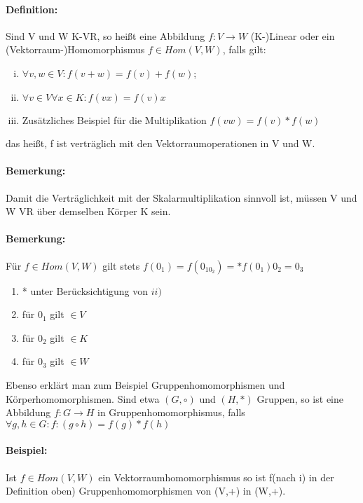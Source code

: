 \paragraph{Definition:} Sind V und W K-VR, so heißt eine Abbildung $f: V \rightarrow W$ (K-)Linear oder ein (Vektorraum-)Homomorphismus $f\in Hom(V,W)$, falls gilt:

\begin{enumerate}[(i)]
	\item $\forall v,w \in V: f(v+w) = f(v) + f(w)$;
	\item $\forall v\in V \forall x\in K: f(vx) = f(v)x$
	\item Zusätzliches Beispiel für die Multiplikation $f(vw) = f(v) * f(w)$
\end{enumerate}
    das heißt, f ist verträglich mit den Vektorraumoperationen in V und W.
\paragraph{Bemerkung:} Damit die Verträglichkeit mit der Skalarmultiplikation sinnvoll ist, müssen V und W VR über demselben Körper K sein.
   \paragraph{Bemerkung:} Für $f\in Hom(V,W)$ gilt stets $f(0_1) = f(0_10_2) =* f(0_1)0_2 = 0_3$
   \begin{enumerate}
   	\item * unter Berücksichtigung von $ii)$
   	\item für $0_1$ gilt $\in V$
	\item für $0_2$ gilt $\in K$
	\item für $0_3$ gilt $\in W$
   \end{enumerate}
  Ebenso erklärt man zum Beispiel Gruppenhomomorphismen und Körperhomomorphismen. Sind etwa $(G,\circ)$ und $(H,*)$ Gruppen, so ist eine Abbildung $f: G \rightarrow H$ in Gruppenhomomorphismus, falls $\forall g,h \in G: f:(g\circ h) = f(g) * f(h)$
  \paragraph{Beispiel:} Ist $f\in Hom(V,W)$ ein Vektorraumhomomorphismus so ist f(nach i) in der Definition oben) Gruppenhomomorphismen von (V,+) in (W,+).
  
